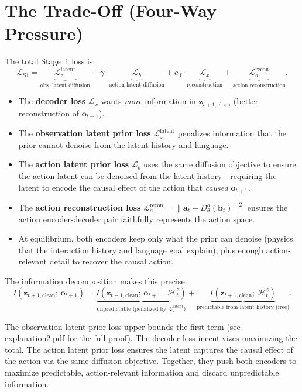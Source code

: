 \documentclass{article}
\newcommand{\vo}{\bm{o}}
\newcommand{\vz}{\bm{z}}
\newcommand{\va}{\bm{a}}
\newcommand{\vb}{\bm{b}}
\newcommand{\loss}{\mathcal{L}}
\begin{document}
\section{The Trade-Off (Four-Way Pressure)}

The total Stage~1 loss is:
\begin{equation}
  \loss_{\text{S1}} = \underbrace{\loss_z^{\text{latent}}}_{\text{obs.\ latent diffusion}} + \gamma \cdot \underbrace{\loss_b}_{\text{action latent diffusion}} + c_{\text{lf}} \cdot \underbrace{\loss_x}_{\text{reconstruction}} + \underbrace{\loss_a^{\text{recon}}}_{\text{action reconstruction}}.
  \label{eq:total}
\end{equation}

\begin{itemize}[leftmargin=*]
  \item The \textbf{decoder loss} $\loss_x$ wants \emph{more} information in $\vz_{t+1,\text{clean}}$ (better reconstruction of $\vo_{t+1}$).
  \item The \textbf{observation latent prior loss} $\loss_z^{\text{latent}}$ penalizes information that the prior cannot denoise from the latent history and language.
  \item The \textbf{action latent prior loss} $\loss_b$ uses the same diffusion objective to ensure the action latent can be denoised from the latent history---requiring the latent to encode the causal effect of the action that \emph{caused} $\vo_{t+1}$.
  \item The \textbf{action reconstruction loss} $\loss_a^{\text{recon}} = \|\va_t - D_\theta^a(\vb_t)\|^2$ ensures the action encoder-decoder pair faithfully represents the action space.
  \item At equilibrium, both encoders keep only what the prior can denoise (physics that the interaction history and language goal explain), plus enough action-relevant detail to recover the causal action.
\end{itemize}

The information decomposition makes this precise:
\begin{equation}
  I(\vz_{t+1,\text{clean}};\, \vo_{t+1}) = \underbrace{I(\vz_{t+1,\text{clean}};\, \vo_{t+1} \mid \mathcal{H}_t^z)}_{\text{unpredictable (penalized by } \loss_z^{\text{latent}}\text{)}} + \underbrace{I(\vz_{t+1,\text{clean}};\, \mathcal{H}_t^z)}_{\text{predictable from latent history (free)}}.
  \label{eq:info_decomp}
\end{equation}

The observation latent prior loss upper-bounds the first term (see explanation2.pdf for the full proof).
The decoder loss incentivizes maximizing the total.
The action latent prior loss ensures the latent captures the causal effect of the action via the same diffusion objective.
Together, they push both encoders to maximize predictable, action-relevant information and discard unpredictable information.
\end{document}
